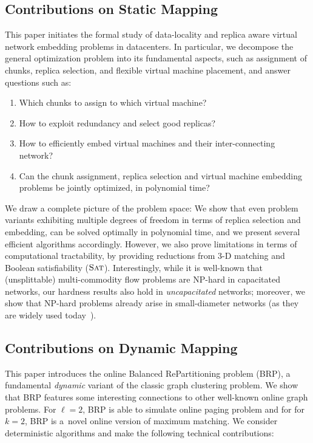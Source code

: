 \subsection{Contributions on Static Mapping}

This paper initiates the formal study of data-locality and replica aware virtual network embedding problems in datacenters.
In particular, we decompose the general optimization problem into its fundamental aspects, such as
assignment of chunks, replica selection, and flexible virtual machine
placement, and answer questions such as:
\begin{enumerate}
\item Which chunks to assign to which virtual machine?

\item How to exploit redundancy and select good replicas?

\item How to efficiently embed virtual machines and their inter-connecting network?

\item Can the chunk assignment, replica selection and virtual machine embedding problems be jointly optimized, in polynomial time?
\end{enumerate}

We draw a complete picture of the problem space: We show that
even problem variants exhibiting multiple degrees of freedom in terms of
replica selection and embedding,
can be solved optimally in polynomial time, and we present several efficient
algorithms accordingly. However, we also prove limitations in terms of
computational tractability, by providing reductions from 3-D matching
and Boolean satisfiability ($\textsc{Sat}$). Interestingly,
while it is well-known that (unsplittable) multi-commodity flow
problems are NP-hard in capacitated networks, our hardness results also hold in \emph{uncapacitated}
networks; moreover, we show that NP-hard problems already arise in small-diameter networks (as they are
widely used today~\cite{fattree}).

\subsection{Contributions on Dynamic Mapping}


This paper introduces the online Balanced RePartitioning problem (BRP),
a fundamental \emph{dynamic} variant of the classic graph clustering problem. 
We show that BRP features some interesting connections to other well-known
online graph problems. For $\ell=2$, BRP is able to simulate online paging problem
and for for $k=2$, BRP is a~novel online version of maximum matching.
We consider deterministic algorithms and make the following technical
contributions:

